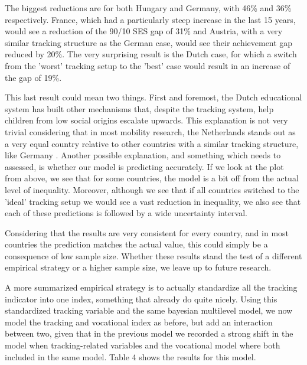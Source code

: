 \documentclass[11pt, a4paper]{article}\usepackage[]{graphicx}\usepackage[]{color}
\begin{document}
The biggest reductions are for both Hungary and Germany, with 46\% and 36\% respectively. France, which had a particularly steep increase in the last 15 years, would see a reduction of the 90/10 SES gap of 31\% and Austria, with a very similar tracking structure as the German case, would see their achievement gap reduced by 20\%. The very surprising result is the Dutch case, for which a switch from the 'worst' tracking setup to the 'best' case would result in an increase of the gap of 19\%.

This last result could mean two things. First and foremost, the Dutch educational system has built other mechanisms that, despite the tracking system, help children from low social origins escalate upwards. This explanation is not very trivial considering that in most mobility research, the Netherlands stands out as a very equal country relative to other countries with a similar tracking structure, like Germany \citep{shavit1993, esping2012}. Another possible explanation, and something which needs to assessed, is whether our model is predicting accurately. If we look at the plot from above, we see that for some countries, the model is a bit off from the actual level of inequality. Moreover, although we see that if all countries switched to the 'ideal' tracking setup we would see a vast reduction in inequality, we also see that each of these predictions is followed by a wide uncertainty interval. 

Considering that the results are very consistent for every country, and in most countries the prediction matches the actual value, this could simply be a consequence of low sample size. Whether these results stand the test of a different empirical strategy or a higher sample size, we leave up to future research.

A more summarized empirical strategy is to actually standardize all the tracking indicator into one index, something that \citet{bol2013} already do quite nicely. Using this standardized tracking variable and the same bayesian multilevel model, we now model the tracking and vocational index as before, but add an interaction between two, given that in the previous model we recorded a strong shift in the model when tracking-related variables and the vocational model where both included in the same model. Table 4 shows the results for this model.
\end{document}
